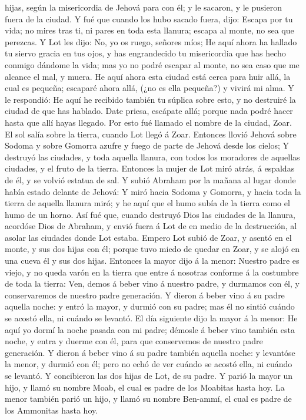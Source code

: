 hijas, según la misericordia de Jehová para con él; y le sacaron, y le
pusieron fuera de la ciudad.  Y fué que cuando los hubo
sacado fuera, dijo: Escapa por tu vida; no mires tras ti, ni pares en
toda esta llanura; escapa al monte, no sea que perezcas.  Y
Lot les dijo: No, yo os ruego, señores míos;  He aquí ahora
ha hallado tu siervo gracia en tus ojos, y has engrandecido tu
misericordia que has hecho conmigo dándome la vida; mas yo no podré
escapar al monte, no sea caso que me alcance el mal, y muera.
 He aquí ahora esta ciudad está cerca para huir allá, la
cual es pequeña; escaparé ahora allá, (¿no es ella pequeña?) y vivirá mi
alma.  Y le respondió: He aquí he recibido también tu
súplica sobre esto, y no destruiré la ciudad de que has hablado.
 Date priesa, escápate allá; porque nada podré hacer hasta
que allí hayas llegado. Por esto fué llamado el nombre de la ciudad,
Zoar.  El sol salía sobre la tierra, cuando Lot llegó á
Zoar.  Entonces llovió Jehová sobre Sodoma y sobre Gomorra
azufre y fuego de parte de Jehová desde los cielos;  Y
destruyó las ciudades, y toda aquella llanura, con todos los moradores
de aquellas ciudades, y el fruto de la tierra.  Entonces la
mujer de Lot miró atrás, á espaldas de él, y se volvió estatua de sal.
 Y subió Abraham por la mañana al lugar donde había estado
delante de Jehová:  Y miró hacia Sodoma y Gomorra, y hacia
toda la tierra de aquella llanura miró; y he aquí que el humo subía de
la tierra como el humo de un horno.  Así fué que, cuando
destruyó Dios las ciudades de la llanura, acordóse Dios de Abraham, y
envió fuera á Lot de en medio de la destrucción, al asolar las ciudades
donde Lot estaba.  Empero Lot subió de Zoar, y asentó en el
monte, y sus dos hijas con él; porque tuvo miedo de quedar en Zoar, y se
alojó en una cueva él y sus dos hijas.  Entonces la mayor
dijo á la menor: Nuestro padre es viejo, y no queda varón en la tierra
que entre á nosotras conforme á la costumbre de toda la tierra:
 Ven, demos á beber vino á nuestro padre, y durmamos con
él, y conservaremos de nuestro padre generación.  Y dieron
á beber vino á su padre aquella noche: y entró la mayor, y durmió con su
padre; mas él no sintió cuándo se acostó ella, ni cuándo se levantó.
 El día siguiente dijo la mayor á la menor: He aquí yo
dormí la noche pasada con mi padre; démosle á beber vino también esta
noche, y entra y duerme con él, para que conservemos de nuestro padre
generación.  Y dieron á beber vino á su padre también
aquella noche: y levantóse la menor, y durmió con él; pero no echó de
ver cuándo se acostó ella, ni cuándo se levantó.  Y
concibieron las dos hijas de Lot, de su padre.  Y parió la
mayor un hijo, y llamó su nombre Moab, el cual es padre de los Moabitas
hasta hoy.  La menor también parió un hijo, y llamó su
nombre Ben-ammí, el cual es padre de los Ammonitas hasta hoy.


